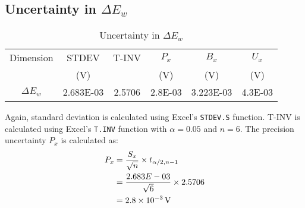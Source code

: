 \section{}

\subsection{Uncertainty in $\Delta E_w$}

\begin{table}[h]
    \centering
    \caption{Uncertainty in $\Delta E_w$}
    \label{tab:Q5UncertaintyDeltaEw}
    \begin{tabular}{cccccc}
        \toprule
        Dimension & STDEV & T-INV & $P_x$ & $B_x$ & $U_x$ \\
        & (V) & & (V) & (V) & (V) \\
        \midrule
        $\Delta E_w$ & 2.683E-03 & 2.5706 & 2.8E-03 & 3.223E-03 & 4.3E-03 \\
        \bottomrule
    \end{tabular}
\end{table}

Again, standard deviation is calculated using Excel's \texttt{STDEV.S} function. T-INV is calculated using Excel's \texttt{T.INV} function with $\alpha = 0.05$ and $n = 6$. 
The precision uncertainty $P_x$ is calculated as:
\begin{align*}
    P_x &= \frac{S_x}{\sqrt{n}} \times t_{\alpha/2, n-1} \\
    &= \frac{2.683E-03}{\sqrt{6}} \times 2.5706 \\
    &= \qty{2.8E-03}{V}
\end{align*}

